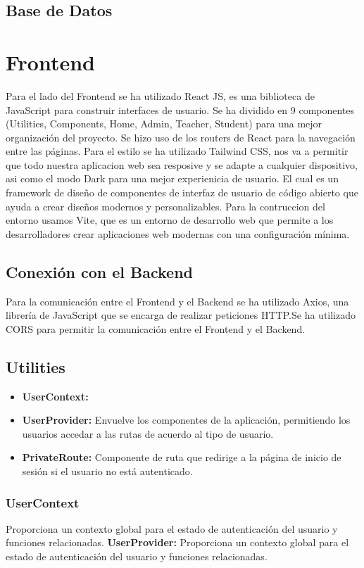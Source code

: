 \documentclass{article}
\begin{document}
\subsection{Base de Datos}

\section{Frontend}
Para el lado del Frontend se ha utilizado React JS, es una biblioteca de JavaScript para construir interfaces de usuario. Se ha dividido en 9 componentes (Utilities, Components, Home, Admin, Teacher, Student) para una mejor organización del proyecto. Se hizo uso de los routers de React para la navegación entre las páginas. Para el estilo se ha utilizado Tailwind CSS, nos va a permitir que todo nuestra aplicacion web sea resposive y se adapte a cualquier dispositivo, asi como el modo Dark para una mejor experienicia de usuario. El cual es un framework de diseño de componentes de interfaz de usuario de código abierto que ayuda a crear diseños modernos y personalizables. Para la contruccion del entorno usamos Vite, que es un entorno de desarrollo web que permite a los desarrolladores crear aplicaciones web modernas con una configuración mínima.
\subsection{Conexión con el Backend}
Para la comunicación entre el Frontend y el Backend se ha utilizado Axios, una librería de JavaScript que se encarga de realizar peticiones HTTP.Se ha utilizado CORS para permitir la comunicación entre el Frontend y el Backend.

\subsection{Utilities}
\begin{itemize}
	\item \textbf{UserContext:}
	\item \textbf{UserProvider:} Envuelve los componentes de la aplicación, permitiendo los usuarios accedar a las rutas de acuerdo al tipo de usuario.
	\item \textbf{PrivateRoute:} Componente de ruta que redirige a la página de inicio de sesión si el usuario no está autenticado.
\end{itemize}

\subsubsection{UserContext}
Proporciona un contexto global para el estado de autenticación del usuario y funciones relacionadas.
\textbf{UserProvider:} Proporciona un contexto global para el estado de autenticación del usuario y funciones relacionadas.
\inputminted{javascript}{../fronted/src/components/useContext.jsx}
\end{document}
